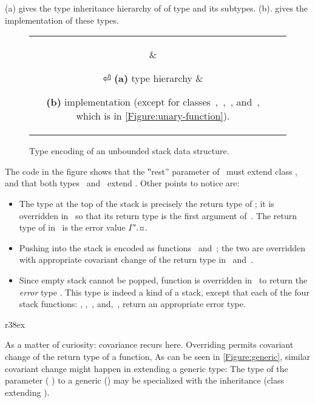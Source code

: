 (a) gives the type inheritance hierarchy of
of type  and its subtypes.
(b).
gives the implementation of these types.

\begin{figure}[!htb]
  \caption{Type encoding of an unbounded stack data structure.}
  \label{Figure:stack-encoding}
  \begin{tabular}{cc}
    \parbox[c]{0.3\linewidth}{%
      
    } &
    \hspace{-3ex} \parbox[c]{63ex}{}⏎
    \textbf{(a)} type hierarchy &
    \hspace{-3ex} \parbox[t]{63ex}{%
    \textbf{(b)} implementation (except
    for classes~,~,~, and~, which is in \cref{Figure:unary-function}).}
  \end{tabular}
\end{figure}

The code in the figure shows that the ‟rest” parameter of~ must extend class ,
  and that both types~ and~ extend .
Other points to notice are:
\begin{itemize}
  \item The type at the top of the stack is precisely the return type of ;
        it is overridden in~ so that its return type is the first argument of~.
        The return type of  in~ is the error value {$Γ'$.¤}.
  \item Pushing into the stack is encoded as functions~ and~;
        the two are overridden with appropriate covariant change of the return type in~ and~.

  \item Since empty stack cannot be popped, function  is overridden in~ to return
    the \emph{error} type . This type is indeed a kind of a stack, except that each of the four stack
        functions: , ,~, and,~, return an appropriate error type.
\end{itemize}

\begin{wrapfigure}[5]r{38ex}
  \caption{\label{Figure:generic} Covariance with generics}
\end{wrapfigure}
As a matter of curiosity: covariance recurs here.
Overriding permits covariant change of the return type of a function,
As can be seen in \cref{Figure:generic}, similar covariant change might happen in extending a generic type:
The type of the parameter ( ) to a generic () may
be specialized with the inheritance (class  extending ).

